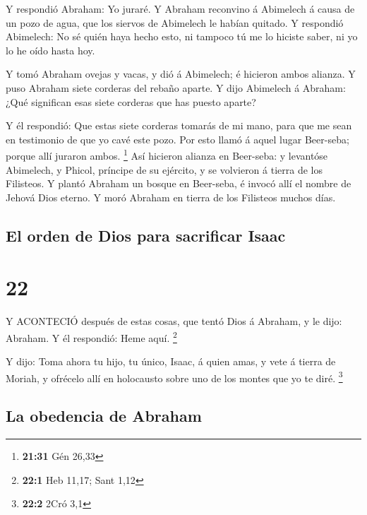  Y respondió Abraham: Yo juraré.  Y Abraham
reconvino á Abimelech á causa de un pozo de agua, que los siervos de
Abimelech le habían quitado.  Y respondió Abimelech: No sé
quién haya hecho esto, ni tampoco tú me lo hiciste saber, ni yo lo he
oído hasta hoy.

 Y tomó Abraham ovejas y vacas, y dió á Abimelech; é
hicieron ambos alianza.  Y puso Abraham siete corderas del
rebaño aparte.  Y dijo Abimelech á Abraham: ¿Qué significan
esas siete corderas que has puesto aparte?

 Y él respondió: Que estas siete corderas tomarás de mi
mano, para que me sean en testimonio de que yo cavé este pozo.
 Por esto llamó á aquel lugar Beer-seba; porque allí
juraron ambos. \footnote{\textbf{21:31} Gén 26,33}  Así
hicieron alianza en Beer-seba: y levantóse Abimelech, y Phicol, príncipe
de su ejército, y se volvieron á tierra de los Filisteos. 
Y plantó Abraham un bosque en Beer-seba, é invocó allí el nombre de
Jehová Dios eterno.  Y moró Abraham en tierra de los
Filisteos muchos días.

\hypertarget{el-orden-de-dios-para-sacrificar-isaac}{%
\subsection{El orden de Dios para sacrificar
Isaac}\label{el-orden-de-dios-para-sacrificar-isaac}}

\hypertarget{section-21}{%
\section{22}\label{section-21}}

 Y ACONTECIÓ después de estas cosas, que tentó Dios á
Abraham, y le dijo: Abraham. Y él respondió: Heme aquí. \footnote{\textbf{22:1}
  Heb 11,17; Sant 1,12}

 Y dijo: Toma ahora tu hijo, tu único, Isaac, á quien amas,
y vete á tierra de Moriah, y ofrécelo allí en holocausto sobre uno de
los montes que yo te diré. \footnote{\textbf{22:2} 2Cró 3,1}

\hypertarget{la-obedencia-de-abraham}{%
\subsection{La obedencia de Abraham}\label{la-obedencia-de-abraham}}

